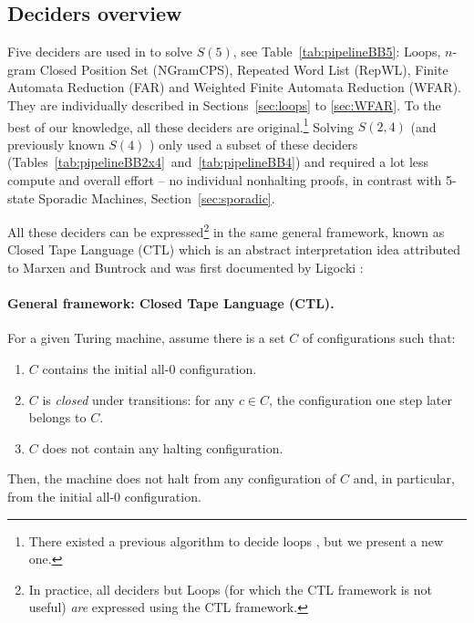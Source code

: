 \subsection{Deciders overview}\label{sec:deciders-overview}

Five deciders are used in \CoqBB to solve $S(5)$, see Table~\ref{tab:pipelineBB5}: Loops, $n$-gram Closed Position Set (NGramCPS), Repeated Word List (RepWL), Finite Automata Reduction (FAR) and Weighted Finite Automata Reduction (WFAR). They are individually described in Sections~\ref{sec:loops} to \ref{sec:WFAR}. To the best of our knowledge, all these deciders are original.\footnote{There existed a previous algorithm to decide loops \cite{Lin1963}, but we present a new one.} Solving $S(2,4)$ (and previously known $S(4)$ \cite{Brady83}) only used  a subset of these deciders (Tables~\ref{tab:pipelineBB2x4}~and~\ref{tab:pipelineBB4}) and required a lot less compute and overall effort -- \eg no individual nonhalting proofs, in contrast with 5-state Sporadic Machines, Section~\ref{sec:sporadic}.

All these deciders can be expressed\footnote{In practice, all deciders but Loops (for which the CTL framework is not useful) \textit{are} expressed using the CTL framework.} in the same general framework, known as Closed Tape Language (CTL) which is an abstract interpretation idea attributed to Marxen and Buntrock and was first documented by Ligocki \cite{ShawnCTL}:
\vspace{-1ex}
\paragraph{General framework: Closed Tape Language (CTL).} For a given Turing machine, assume there is a set $C$ of configurations such that:
\begin{enumerate}
  \item $C$ contains the initial all-0 configuration.
  \item $C$ is \textit{closed} under transitions: for any $c \in C$, the configuration one step later belongs to $C$.
  \item $C$ does not contain any halting configuration.
\end{enumerate}


Then, the machine does not halt from any configuration of $C$ and, in particular, from the initial all-0 configuration.

\vspace{-1ex}
